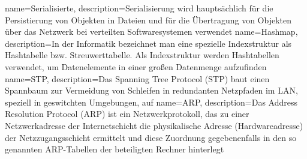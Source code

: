 {
  name=Serialisierte,
  description={Serialisierung wird hauptsächlich für die Persistierung von Objekten in Dateien und für die Übertragung von Objekten über das Netzwerk bei verteilten Softwaresystemen verwendet}
}
{
  name=Hashmap,
  description={In der Informatik bezeichnet man eine spezielle Indexstruktur als Hashtabelle bzw. Streuwerttabelle. Als Indexstruktur werden Hashtabellen verwendet, um Datenelemente in einer großen Datenmenge aufzufinden}
}
{
  name=STP,
  description={Das Spanning Tree Protocol (STP) baut einen Spannbaum zur Vermeidung von Schleifen in redundanten Netzpfaden im LAN, speziell in geswitchten Umgebungen, auf}
}
{
  name=ARP,
  description={Das Address Resolution Protocol (ARP) ist ein Netzwerkprotokoll, das zu einer Netzwerkadresse der Internetschicht die physikalische Adresse (Hardwareadresse) der Netzzugangsschicht ermittelt und diese Zuordnung gegebenenfalls in den so genannten ARP-Tabellen der beteiligten Rechner hinterlegt}
}

